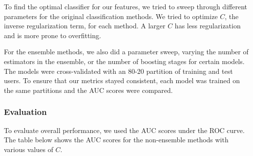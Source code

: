 \documentclass{article} %
\begin{document}
\begin{figure}[h]
    \centering
    \qquad
\end{figure}

To find the optimal classifier for our features, we tried to sweep through different parameters for the original classification methods.
We tried to optimize $C$, the inverse regularization term, for each method.
A larger $C$ has less regularization and is more prone to overfitting.

For the ensemble methods, we also did a parameter sweep, varying the number of
estimators in the ensemble, or the number of boosting stages for certain models.
The models were cross-validated with an 80-20 partition of training and test
users. To ensure that our metrics stayed consistent, each model was trained on
the same partitions and the AUC scores were compared.

\subsubsection{Evaluation}

To evaluate overall performance, we used the AUC scores under the ROC curve.
The table below shows the AUC scores for the non-ensemble methods with various values of $C$.
\end{document}
